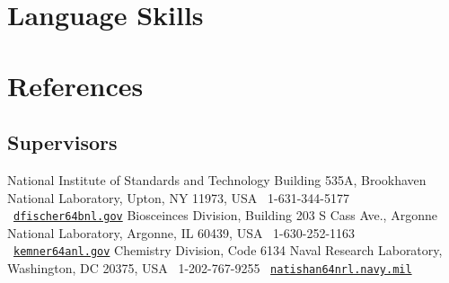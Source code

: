 \documentclass[11pt]{moderncv}
\begin{document}


\section{Language Skills}

\section{References}
\subsection{Supervisors}
%
{National Institute of Standards and Technology\newline
  Building 535A, Brookhaven National Laboratory, Upton, NY 11973, USA\newline
  \phonesymbol\ 1-631-344-5177\quad
  \emailsymbol\ \href{mailto:dfischer@bnl.gov}{\footnotesize\texttt{dfischer\char64bnl.gov}}}
%
{Biosceinces Division, Building 203 S Cass Ave., Argonne National Laboratory, Argonne, IL 60439, USA\newline
  \phonesymbol\ 1-630-252-1163\quad
  \emailsymbol\ \href{mailto:kemner@anl.gov}{\footnotesize\texttt{kemner\char64anl.gov}}}
%
{Chemistry Division, Code 6134\newline
  Naval Research Laboratory, Washington, DC 20375, USA\newline
  \phonesymbol\ 1-202-767-9255\quad
  \emailsymbol\ \href{mailto:natishan@nrl.navy.mil}{\footnotesize\texttt{natishan\char64nrl.navy.mil}}}
\end{document}
